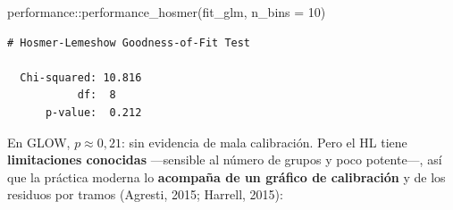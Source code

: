 \documentclass[
  letterpaper,
  DIV=11,
  numbers=noendperiod]{scrartcl}
\newenvironment{Shaded}{\begin{snugshade}}{\end{snugshade}}
\newcommand{\AttributeTok}[1]{\textcolor[rgb]{0.40,0.45,0.13}{#1}}
\newcommand{\DecValTok}[1]{\textcolor[rgb]{0.68,0.00,0.00}{#1}}
\newcommand{\FunctionTok}[1]{\textcolor[rgb]{0.28,0.35,0.67}{#1}}
\newcommand{\NormalTok}[1]{\textcolor[rgb]{0.00,0.23,0.31}{#1}}
\newcommand{\SpecialCharTok}[1]{\textcolor[rgb]{0.37,0.37,0.37}{#1}}
\begin{document}
\begin{Shaded}
\begin{Highlighting}[]
\NormalTok{performance}\SpecialCharTok{::}\FunctionTok{performance\_hosmer}\NormalTok{(fit\_glm, }\AttributeTok{n\_bins =} \DecValTok{10}\NormalTok{)}
\end{Highlighting}
\end{Shaded}

\begin{verbatim}
# Hosmer-Lemeshow Goodness-of-Fit Test

  Chi-squared: 10.816
           df:  8    
      p-value:  0.212
\end{verbatim}

En GLOW, \(p\approx 0{,}21\): sin evidencia de mala calibración. Pero el
HL tiene \textbf{limitaciones conocidas} ---sensible al número de grupos
y poco potente---, así que la práctica moderna lo \textbf{acompaña de un
gráfico de calibración} y de los residuos por tramos (Agresti, 2015;
Harrell, 2015):
\end{document}
